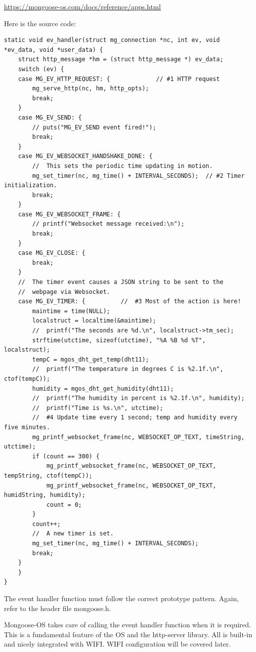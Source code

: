\documentclass[oneside,letterpaper,12pt]{book}
\begin{document}
\url{https://mongoose-os.com/docs/reference/apps.html}

Here is the source code:

\begin{verbatim}
static void ev_handler(struct mg_connection *nc, int ev, void *ev_data, void *user_data) {
    struct http_message *hm = (struct http_message *) ev_data;
    switch (ev) {
    case MG_EV_HTTP_REQUEST: {             // #1 HTTP request
        mg_serve_http(nc, hm, http_opts);
        break;
    }
    case MG_EV_SEND: {
        // puts("MG_EV_SEND event fired!");
        break;
    }
    case MG_EV_WEBSOCKET_HANDSHAKE_DONE: {
        //  This sets the periodic time updating in motion.
        mg_set_timer(nc, mg_time() + INTERVAL_SECONDS);  // #2 Timer initialization.
        break;
    }
    case MG_EV_WEBSOCKET_FRAME: {
        // printf("Websocket message received:\n");
        break;
    }
    case MG_EV_CLOSE: {
        break;
    }
    //  The timer event causes a JSON string to be sent to the
    //  webpage via Websocket.
    case MG_EV_TIMER: {          //  #3 Most of the action is here!
        maintime = time(NULL);
        localstruct = localtime(&maintime);
        //  printf("The seconds are %d.\n", localstruct->tm_sec);
        strftime(utctime, sizeof(utctime), "%A %B %d %T", localstruct);
        tempC = mgos_dht_get_temp(dht11);
        //  printf("The temperature in degrees C is %2.1f.\n", ctof(tempC));
        humidity = mgos_dht_get_humidity(dht11);
        //  printf("The humidity in percent is %2.1f.\n", humidity);
        //  printf("Time is %s.\n", utctime);
        //  #4 Update time every 1 second; temp and humidity every five minutes.
        mg_printf_websocket_frame(nc, WEBSOCKET_OP_TEXT, timeString, utctime);
        if (count == 300) {
            mg_printf_websocket_frame(nc, WEBSOCKET_OP_TEXT, tempString, ctof(tempC));
            mg_printf_websocket_frame(nc, WEBSOCKET_OP_TEXT, humidString, humidity);
            count = 0;
        }
        count++;
        //  A new timer is set.
        mg_set_timer(nc, mg_time() + INTERVAL_SECONDS);
        break;
    }
    }
}
\end{verbatim}

The event handler function must follow the correct prototype pattern.
Again, refer to the header file mongoose.h.

Mongoose-OS takes care of calling the event handler function when it is
required. This is a fundamental feature of the OS and the http-server
library. All is built-in and nicely integrated with WIFI. WIFI
configuration will be covered later.
\end{document}
